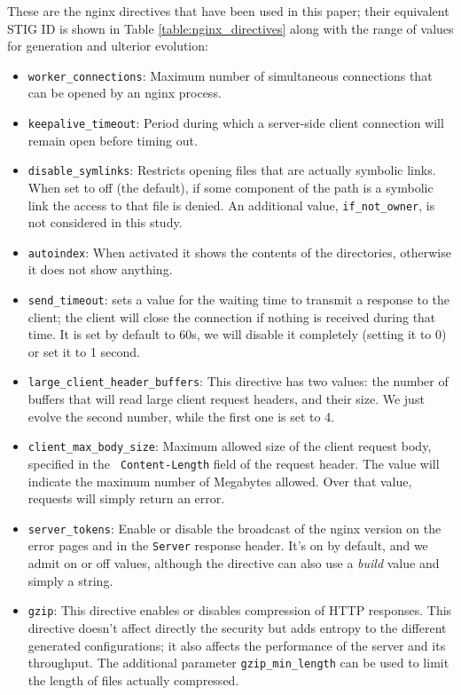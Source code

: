 \documentclass[sigconf]{acmart}
\begin{document}
These are the {\sf nginx} directives that have been used in this paper; their
equivalent STIG ID is shown in Table
\ref{table:nginx_directives} along with the range of values for
generation and ulterior evolution:\begin{itemize}
\item \texttt{worker\_connections}: Maximum number of simultaneous connections that can be opened by an {\sf nginx} process.
\item \texttt{keepalive\_timeout}: Period during which a server-side client
  connection will remain open  before timing out.
\item \texttt{disable\_symlinks}: Restricts opening files that are
  actually symbolic links. When set to off (the default), if  some component of the
  path is a symbolic link the access to that file is denied. An
  additional value, {\tt if\_not\_owner}, is not considered in this study.
\item \texttt{autoindex}: When activated it shows the contents of the directories, otherwise it does not show anything.
\item \texttt{send\_timeout}: sets a value for the waiting time to
  transmit a response to the client; the client will close the
  connection if nothing is received during that time. It is set by
  default to 60s, we will disable it completely (setting it to 0) or
  set it to 1 second.
\item \texttt{large\_client\_header\_buffers}: This directive has two
  values: the number of buffers that will read large client request
  headers, and their size. We just evolve the second number, while the
  first one is set to 4.

\item \texttt{client\_max\_body\_size}: Maximum allowed size of the client request body, specified in the {\tt
  Content-Length} field of the request header. The value will indicate
the maximum number of Megabytes allowed. Over that value, requests
will simply return an error.

\item \texttt{server\_tokens}: Enable or disable the broadcast of the {\sf
  nginx} version on the error pages and in the {\tt Server} response
header. It's on by default, and we admit on or off values, although the
directive can also use a {\em build} value and simply a string.
\item
\texttt{gzip}: This directive enables or disables compression of HTTP
responses. This directive doesn't affect directly the security but
adds entropy to the different generated configurations; it also
affects the performance of the server and its throughput. The
additional parameter {\tt gzip\_min\_length} can be used to limit the
length of files actually compressed.
\end{itemize}
\end{document}
